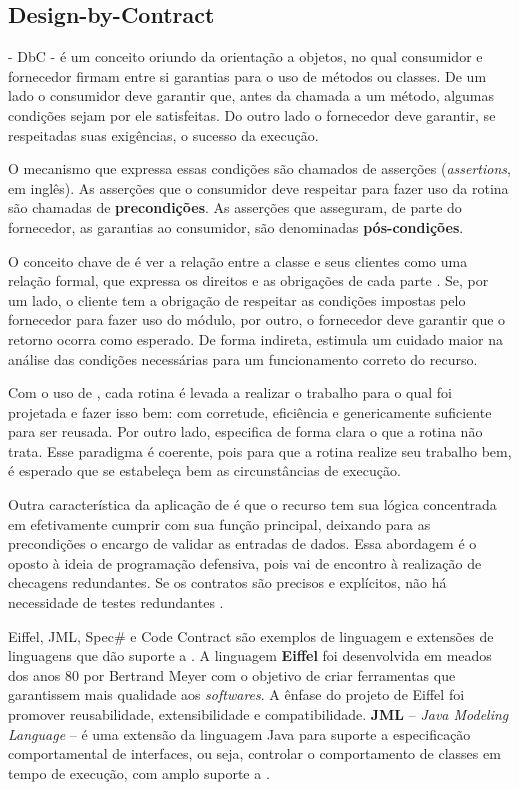 
\subsection{Design-by-Contract}

\designbycontract{} \cite{meyer1992applying} - DbC - é um conceito
oriundo da orientação a objetos, no qual consumidor e fornecedor firmam entre si garantias para
o uso de métodos ou classes. De um lado o consumidor deve garantir que, antes da
chamada a um método, algumas condições sejam por ele satisfeitas.
Do outro lado o fornecedor deve garantir, se respeitadas suas exigências,
o sucesso da execução.

O mecanismo que expressa essas condições são chamados de asserções
(\textit{assertions}, em inglês). As asserções que o consumidor deve respeitar
para fazer uso da rotina são chamadas de \textbf{precondições}. As asserções que
asseguram, de parte do fornecedor, as garantias ao consumidor, são denominadas
\textbf{pós-condições}.

O conceito chave de \designbycontract{} é ver a relação entre a classe e
seus clientes como uma relação formal, que expressa os direitos e as
obrigações de cada parte \cite{meyer1997object}. Se, por um lado, o
cliente tem a obrigação de respeitar as condições impostas pelo fornecedor para fazer uso do módulo, por
outro, o fornecedor deve garantir que o retorno ocorra como esperado. De forma
indireta, \designbycontract{} estimula um cuidado maior na análise das condições necessárias para um funcionamento correto do recurso.

Com o uso de \designbycontract{}, cada rotina é levada a realizar o trabalho
para o qual foi projetada e fazer isso bem: com corretude, eficiência e
genericamente suficiente para ser reusada. Por outro lado, especifica de forma
clara o que a rotina não trata. Esse paradigma é coerente, pois para que a
rotina realize seu trabalho bem, é esperado que se estabeleça bem as
circunstâncias de execução.

Outra característica da aplicação de \designbycontract{} é que o recurso tem sua
lógica concentrada em efetivamente cumprir com sua função principal, deixando
para as precondições o encargo de validar as entradas de dados. Essa abordagem
é o oposto à ideia de programação defensiva, pois vai de encontro à realização
de checagens redundantes. Se os contratos são precisos e explícitos, não há
necessidade de testes redundantes \cite{meyer1992applying}.

Eiffel, JML, Spec\# e Code Contract são exemplos de linguagem e extensões de
linguagens que dão suporte a \designbycontract{}. A linguagem \textbf{Eiffel} foi desenvolvida 
em meados dos anos 80 por
Bertrand Meyer \cite{meyer1988eiffel} com o objetivo de criar ferramentas que
garantissem mais qualidade aos \textit{softwares}. A ênfase do projeto de
Eiffel foi promover reusabilidade, extensibilidade e compatibilidade.
\textbf{JML} -- \textit{Java Modeling Language} -- é uma extensão da linguagem
Java para suporte a especificação comportamental de interfaces, ou seja, controlar o
comportamento de classes em tempo de execução, com amplo suporte a \designbycontract{}.


